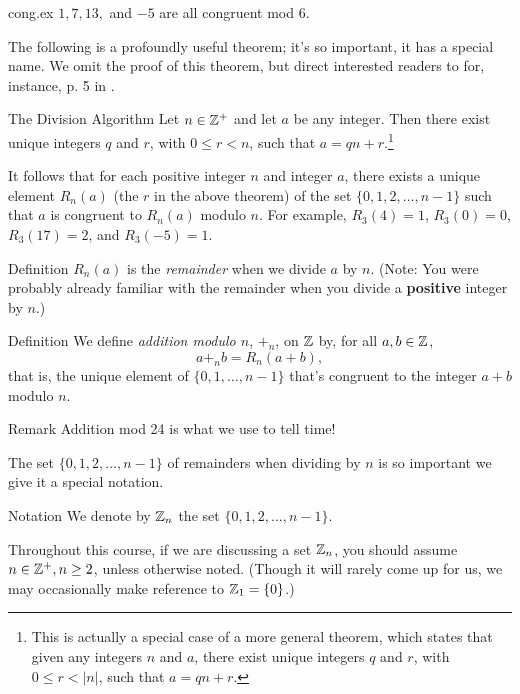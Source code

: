 \begin{example}{cong.ex} $1, 7, 13,$ and $-5$ are all congruent mod $6$. \end{example}

The following is a profoundly useful theorem; it's so
important, it has a special name. We omit the proof of this theorem,
but direct interested readers to for, instance, p. 5 in \cite{NZM}.

\begin{df}{The Division Algorithm} Let $n\in \mathbb{Z}^+$ and let $a$ be any
integer.  Then there exist unique integers $q$ and $r$, with $0\leq
r <n$, such that $a=qn+r$.\footnote{This is actually a special case
of a more general theorem, which states that given any integers $n$
and $a$, there exist unique integers $q$ and $r$, with $0\leq
r<|n|$, such that $a=qn+r$.}\end{df}

 It follows that for each positive integer $n$ and integer $a$,
there exists a unique element $R_n(a)$ (the $r$ in the above
theorem) of the set $\{0,1,2,\ldots, n-1\}$ such that $a$ is
congruent to $R_n(a)$ modulo $n$. For example, $R_3(4)=1$, $R_3(0)=0$,
$R_3(17)=2$, and $R_3(-5)=1$.


\begin{df}{Definition} $R_n(a)$ is the \textit{remainder} when we divide $a$ by $n$. (Note: You were probably already familiar with the remainder when you divide a \textbf{positive} integer by $n$.)\end{df}

\begin{df}{Definition} We define \textit{addition modulo $n$}, $+_n$, on $\mathbb{Z}$ by,
for all $a,b\in \mathbb{Z}$,
$$a+_n b=R_n(a+b),$$ that is, the unique element of $\{0,1,\ldots, n-1\}$ that's congruent to the integer $a+b$ modulo $n$.\end{df}


\begin{df}{Remark} Addition mod 24 is what we use to tell
time!\end{df}

 The set $\{0,1,2,\ldots, n-1\}$ of remainders when dividing by $n$ is so important we give it a
special notation.


\begin{df}{Notation} We denote by $\mathbb{Z}_n$ the set $\{0,1,2,\ldots,n-1\}$.\end{df}

Throughout this course, if we are discussing a set $\mathbb{Z}_n$, you
should assume $n\in \mathbb{Z}^+, n\geq 2$, unless otherwise noted.
(Though it will rarely come up for us, we may occasionally make
reference to $\mathbb{Z}_1=\{0\}$.)

